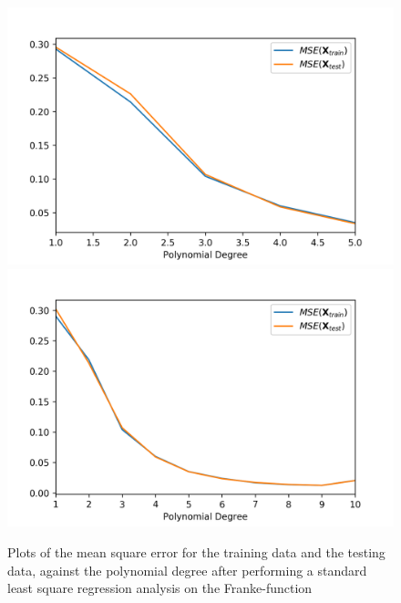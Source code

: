 \documentclass[a4paper,10pt,english]{article}
\begin{document}
\begin{figure}[H]
	\centering 
	\includegraphics[scale=0.63]{../franke_output/part_C_2.png}
	\includegraphics[scale=0.63]{../franke_output/part_C_2_highdeg.png}
	\caption{
		Plots of the mean square error for the training data and the testing data, against the polynomial degree after performing a standard least square regression analysis on the Franke-function
	}
	\label{part_c2}
\end{figure}



\end{document}
